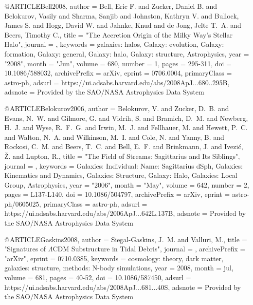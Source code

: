 \documentclass[apj]{emulateapj}
\begin{document}
{{{{{{{{{@ARTICLE{Bell2008,
       author = {{Bell}, Eric F. and {Zucker}, Daniel B. and {Belokurov}, Vasily and
         {Sharma}, Sanjib and {Johnston}, Kathryn V. and {Bullock}, James S. and
         {Hogg}, David W. and {Jahnke}, Knud and {de Jong}, Jelte T.~A. and
         {Beers}, Timothy C.},
        title = "{The Accretion Origin of the Milky Way's Stellar Halo}",
      journal = {\apj},
     keywords = {galaxies: halos, Galaxy: evolution, Galaxy: formation, Galaxy: general, Galaxy: halo, Galaxy: structure, Astrophysics},
         year = "2008",
        month = "Jun",
       volume = {680},
       number = {1},
        pages = {295-311},
          doi = {10.1086/588032},
archivePrefix = {arXiv},
       eprint = {0706.0004},
 primaryClass = {astro-ph},
       adsurl = {https://ui.adsabs.harvard.edu/abs/2008ApJ...680..295B},
      adsnote = {Provided by the SAO/NASA Astrophysics Data System}
}



@ARTICLE{Belokurov2006,
       author = {{Belokurov}, V. and {Zucker}, D.~B. and {Evans}, N.~W. and
         {Gilmore}, G. and {Vidrih}, S. and {Bramich}, D.~M. and
         {Newberg}, H.~J. and {Wyse}, R.~F.~G. and {Irwin}, M.~J. and
         {Fellhauer}, M. and {Hewett}, P.~C. and {Walton}, N.~A. and
         {Wilkinson}, M.~I. and {Cole}, N. and {Yanny}, B. and {Rockosi}, C.~M. and
         {Beers}, T.~C. and {Bell}, E.~F. and {Brinkmann}, J. and
         {Ivezi{\'c}}, {\v{Z}}. and {Lupton}, R.},
        title = "{The Field of Streams: Sagittarius and Its Siblings}",
      journal = {\apj},
     keywords = {Galaxies: Individual: Name: Sagittarius dSph, Galaxies: Kinematics and Dynamics, Galaxies: Structure, Galaxy: Halo, Galaxies: Local Group, Astrophysics},
         year = "2006",
        month = "May",
       volume = {642},
       number = {2},
        pages = {L137-L140},
          doi = {10.1086/504797},
archivePrefix = {arXiv},
       eprint = {astro-ph/0605025},
 primaryClass = {astro-ph},
       adsurl = {https://ui.adsabs.harvard.edu/abs/2006ApJ...642L.137B},
      adsnote = {Provided by the SAO/NASA Astrophysics Data System}
}



@ARTICLE{Gaskins2008,
   author = {{Siegal-Gaskins}, J.~M. and {Valluri}, M.},
    title = "{Signatures of {$\Lambda$}CDM Substructure in Tidal Debris}",
  journal = {\apj},
archivePrefix = "arXiv",
   eprint = {0710.0385},
 keywords = {cosmology: theory, dark matter, galaxies: structure, methods: N-body simulations},
     year = 2008,
    month = jul,
   volume = 681,
    pages = {40-52},
      doi = {10.1086/587450},
   adsurl = {https://ui.adsabs.harvard.edu/abs/2008ApJ...681...40S},
  adsnote = {Provided by the SAO/NASA Astrophysics Data System}
}




}}}}}}}}}
\end{document}
